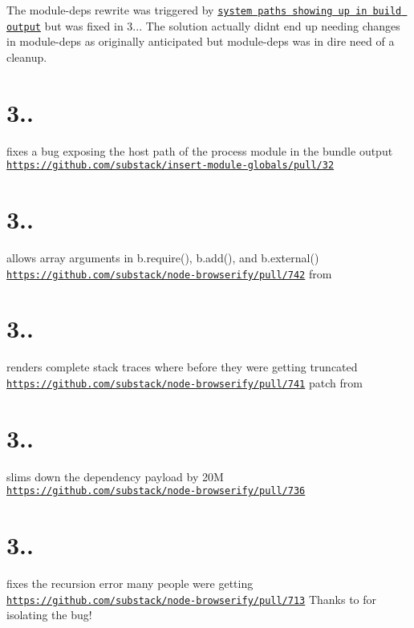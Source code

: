 The module-\/deps rewrite was triggered by \href{https://github.com/substack/node-browserify/issues/675}{\tt system paths showing up in build output} but was fixed in 3... The solution actually didn\textquotesingle{}t end up needing changes in module-\/deps as originally anticipated but module-\/deps was in dire need of a cleanup.

\section*{3..}

fixes a bug exposing the host path of the process module in the bundle output \href{https://github.com/substack/insert-module-globals/pull/32}{\tt https\+://github.\+com/substack/insert-\/module-\/globals/pull/32}

\section*{3..}

allows array arguments in b.\+require(), b.\+add(), and b.\+external() \href{https://github.com/substack/node-browserify/pull/742}{\tt https\+://github.\+com/substack/node-\/browserify/pull/742} from 

\section*{3..}

renders complete stack traces where before they were getting truncated \href{https://github.com/substack/node-browserify/pull/741}{\tt https\+://github.\+com/substack/node-\/browserify/pull/741} patch from 

\section*{3..}

slims down the dependency payload by 20M \href{https://github.com/substack/node-browserify/pull/736}{\tt https\+://github.\+com/substack/node-\/browserify/pull/736}

\section*{3..}

fixes the recursion error many people were getting \href{https://github.com/substack/node-browserify/pull/713}{\tt https\+://github.\+com/substack/node-\/browserify/pull/713} Thanks to  for isolating the bug!

